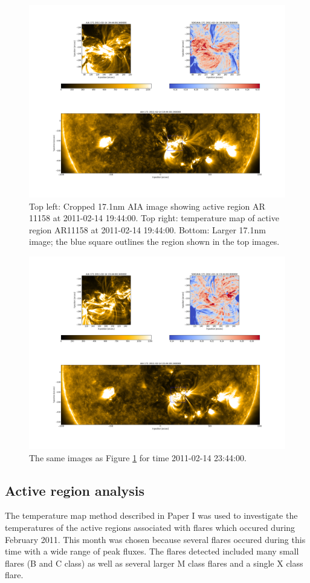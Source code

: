 \documentclass[referee,a4paper,12pt]{swsc}
\begin{document}
\begin{linenumbers}
\begin{figure}
	\centering
		\includegraphics[width=0.9\columnwidth]{20110214T194400with171.png}
	\caption{Top left: Cropped 17.1nm AIA image showing active region AR 11158 at 2011-02-14 19:44:00. Top right: temperature map of active region AR11158 at 2011-02-14 19:44:00. Bottom: Larger 17.1nm image; the blue square outlines the region shown in the top images.}
	\label{fig:trackdemo1}
\end{figure}
\begin{figure}
	\centering
		\includegraphics[width=0.9\columnwidth]{20110214T234400with171.png}
	\caption{The same images as Figure \ref{fig:trackdemo1} for time 2011-02-14 23:44:00.}
	\label{fig:trackdemo2}
\end{figure}

\subsection{Active region analysis}
The temperature map method described in Paper I was used to investigate the temperatures of the active regions associated with flares which occured during February 2011. %
This month was chosen because several flares occured during this time with a wide range of peak fluxes. %
The flares detected included many small flares (B and C class) as well as several larger M class flares and a single X class flare. %


\end{linenumbers}
\end{document}
